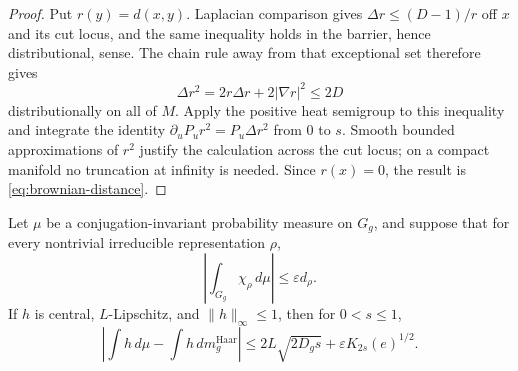 \begin{proof}
Put \(r(y)=d(x,y)\).  Laplacian comparison gives
\(\Delta r\le(D-1)/r\) off \(x\) and its cut locus, and the same inequality
holds in the barrier, hence distributional, sense.  The chain rule away from
that exceptional set therefore gives
\[
 \Delta r^2=2r\Delta r+2|\nabla r|^2\le2D
\]
distributionally on all of \(M\).  Apply the positive heat semigroup to this
inequality and integrate the identity
\(\partial_uP_ur^2=P_u\Delta r^2\) from \(0\) to \(s\).  Smooth bounded
approximations of \(r^2\) justify the calculation across the cut locus; on a
compact manifold no truncation at infinity is needed.  Since \(r(x)=0\), the
result is \eqref{eq:brownian-distance}.
\end{proof}

\begin{proposition}
\label{prop:heat-bridge}
Let \(\mu\) be a conjugation-invariant probability measure on \(G_g\), and
suppose that for every nontrivial irreducible representation \(\rho\),
\begin{equation}
 \left|\int_{G_g}\chi_\rho\,d\mu\right|
 \le\varepsilon d_\rho.
\label{eq:abstract-character-bound}
\end{equation}
If \(h\) is central, \(L\)-Lipschitz, and \(\|h\|_\infty\le1\), then for
\(0<s\le1\),
\begin{equation}
 \boxed{
 \left|\int h\,d\mu-\int h\,dm_g^{\mathrm{Haar}}\right|
 \le2L\sqrt{2D_gs}+\varepsilon K_{2s}(e)^{1/2}.}
\label{eq:abstract-heat-bridge}
\end{equation}
\end{proposition}

